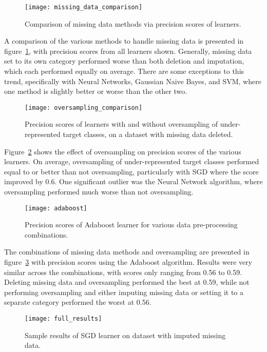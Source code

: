 \documentclass[conference]{IEEEtran}
\begin{document}
\begin{figure}[htpb]
	\centering
	\texttt{[image: missing\_data\_comparison]}
	\caption{Comparison of missing data methods via precision scores of learners.}
	\label{fig:missing_data_comp}
\end{figure}

A comparison of the various methods to handle missing data is presented in figure~\ref{fig:missing_data_comp}, with precision scores from all learners shown. Generally, missing data set to its own category performed worse than both deletion and imputation, which each performed equally on average. There are some exceptions to this trend, specifically with Neural Networks, Gaussian Naive Bayes, and SVM, where one method is slightly better or worse than the other two.

\begin{figure}[htpb]
	\centering
	\texttt{[image: oversampling\_comparison]}
	\caption{Precision scores of learners with and without oversampling of under-represented target classes, on a dataset with missing data deleted.}
	\label{fig:oversampling_comp}
\end{figure}

Figure~\ref{fig:oversampling_comp} shows the effect of oversampling on precision scores of the various learners. On average, oversampling of under-represented target classes performed equal to or better than not oversampling, particularly with SGD where the score improved by 0.6. One significant outlier was the Neural Network algorithm, where oversampling performed much worse than not oversampling.

\begin{figure}[htpb]
	\centering
	\texttt{[image: adaboost]}
	\caption{Precision scores of Adaboost learner for various data pre-processing combinations.}
	\label{fig:adaboost}
\end{figure}

The combinations of missing data methods and oversampling are presented in figure~\ref{fig:adaboost} with precision scores using the Adaboost algorithm. Results were very similar across the combinations, with scores only ranging from 0.56 to 0.59. Deleting missing data and oversampling performed the best at 0.59, while not performing oversampling and either imputing missing data or setting it to a separate category performed the worst at 0.56.

\begin{figure}[htpb]
	\centering
	\texttt{[image: full\_results]}
	\caption{Sample results of SGD learner on dataset with imputed missing data.}
	\label{fig:full_results}
\end{figure}
\end{document}
